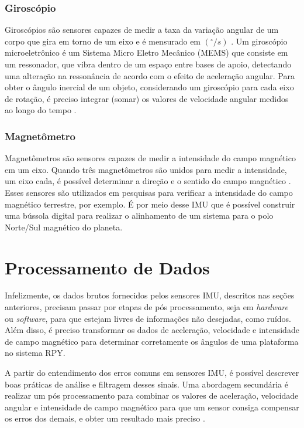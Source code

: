 \subsubsection{Giroscópio}

Giroscópios são sensores capazes de medir a taxa da variação angular de um corpo que gira em torno de um eixo e é mensurado em $ (^{\circ}/s) $ \cite{diss:FabioAUV}. Um giroscópio microeletrônico é um Sistema Micro Eletro Mecânico (MEMS) que consiste em um ressonador, que vibra dentro de um espaço entre bases de apoio, detectando uma alteração na ressonância de acordo com o efeito de aceleração angular. Para obter o ângulo inercial de um objeto, considerando um giroscópio para cada eixo de rotação, é preciso integrar (somar) os valores de velocidade angular medidos ao longo do tempo \cite{tcc:viniciusPID2Graus}.

\subsubsection{Magnetômetro}
Magnetômetros são sensores capazes de medir a intensidade do campo magnético em um eixo. Quando três magnetômetros são unidos para medir a intensidade, um eixo cada, é possível determinar a direção e o sentido do campo magnético \cite{tcc:rafaelEESC}. Esses sensores são utilizados em pesquisas para verificar a intensidade do campo magnético terrestre, por exemplo. É por meio desse IMU que é possível construir uma bússola digital para realizar o alinhamento de um sistema para o polo Norte/Sul magnético do planeta.


\section{Processamento de Dados}

Infelizmente, os dados brutos fornecidos pelos sensores IMU, descritos nas seções anteriores, precisam passar por etapas de pós processamento, seja em \textit{hardware} ou \textit{software}, para que estejam livres de informações não desejadas, como ruídos. Além disso, é preciso transformar os dados de aceleração, velocidade e intensidade de campo magnético para determinar corretamente os ângulos de uma plataforma no sistema RPY. 

A partir do entendimento dos erros comuns em sensores IMU, é possível descrever boas práticas de análise e filtragem desses sinais. Uma abordagem secundária é realizar um pós processamento para combinar os valores de aceleração, velocidade angular e intensidade de campo magnético para que um sensor consiga compensar os erros dos demais, e obter um resultado mais preciso \cite{manual:cambimu}.

